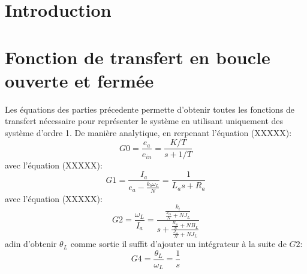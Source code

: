 \documentclass{udes_rapport} %
\begin{document}




\newpage

\tableofcontents
\newpage


\listoffigures
\newpage



\setcounter{page}{1} %
\section{Introduction}

\section{Fonction de transfert en boucle ouverte et fermée}
Les équations des parties précedente permette d'obtenir toutes les fonctions de transfert nécessaire pour représenter le système en utilisant uniquement des système d'ordre 1. De manière analytique, en rerpenant l'équation (XXXXX):
\[	G0 = \frac{e_a}{e_{in}} = \frac{K/T}{s +1/T}	\]
avec l'équation (XXXXX):
\[	G1 = \frac{I_a}{e_a - \frac{k_b \omega_L}{N}} = \frac{1}{L_a s + R_a}						\]
avec l'équation (XXXXX):
\[	G2 = \frac{\omega_L}{I_a} = \frac{\frac{k_i}{\frac{J_m}{N}+N J_L}}{s + \frac{\frac{B_m}{N} + N B_L}{\frac{J_m}{N}+N J_L}}	\]
adin d'obtenir $\theta _L$ comme sortie il suffit d'ajouter un intégrateur à la suite de $G2$:
\[	G4 = \frac{\theta _L}{\omega _L} = \frac{1}{s}	\]
\end{document}
